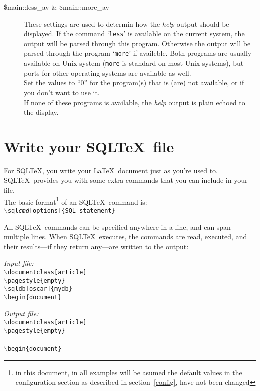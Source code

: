 \documentclass{article}
\newcommand{\bs}{\ensuremath{\backslash}}
\newcommand{\vs}{\vspace{3mm}}
\begin{document}
\begin{description}
\item[\$main::less\_av \& \$main::more\_av] These settings are used to determin how the \textsl{help} output should be displayed. If the
command `\texttt{less}' is available on the current system, the output will be
parsed through this program. Otherwise the output will be parsed through the
program `\texttt{more}' if availeble. Both programs are usually available on Unix
system (\texttt{more} is standard on most Unix systems), but ports for other
operating systems are available as well.\\
Set the values to ``0'' for the program(s) that is (are) not available, or if
you don't want to use it.\\
If none of these programs is available, the \textsl{help} output is plain echoed
to the display.

\end{description}

\section{Write your SQL\TeX\ file}

For SQL\TeX, you write your \LaTeX\ document just as you're used to. SQL\TeX\ provides you with
some extra commands that you can include in your file.\\
The basic format\footnote{in this document, in all examples will be asumed the default values in the
configuration section as described in section~\ref{config}, have not been changed} of an SQL\TeX\ command is: \\
\texttt{\bs sql\emph{cmd}[options]\{SQL statement\}}

\vs

All SQL\TeX\ commands can be specified anywhere in a line, and can span multiple lines.
When SQL\TeX\ executes, the commands are read, executed, and their results---if they return
any---are written to the output:

\vs

\begin{minipage}[t]{0.5\textwidth}\textsl{Input file:}\\\texttt{\footnotesize{\bs documentclass[article] \\
\bs pagestyle\{empty\} \\
\bs sqldb[oscar]\{mydb\} \\
\bs begin\{document\} \\
}}\end{minipage}\hfill\begin{minipage}[t]{0.5\textwidth}\textsl{Output file:}\\\texttt{\footnotesize{\bs documentclass[article] \\
\bs pagestyle\{empty\} \\
 \\
\bs begin\{document\} \\
}}\end{minipage}
\end{document}
